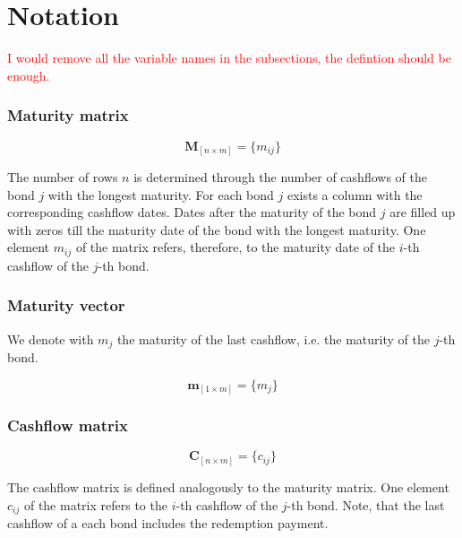 \newpage
\section{Notation}
\label{sec:notation}

\textcolor{red}{I would remove all the variable names in the subsections, the defintion should be enough.}

\subsubsection*{Maturity matrix}

\begin{equation}\label{maturitym}
\bm{M}_{\left[n\times m\right]}= \{m_{ij}\}
\end{equation}

The number of rows $n$ is determined through the number of cashflows of the bond $j$ with the longest maturity. For each bond $j$ exists a column with the corresponding cashflow dates. Dates after the maturity of the bond $j$ are filled up with zeros till the maturity date of the bond with the longest maturity. One element $m_{ij}$ of the matrix  refers, therefore, to the maturity date of  the $i$-th cashflow of the $j$-th bond. 

\subsubsection*{Maturity vector}

We denote with $m_j$ the maturity of the last cashflow, i.e. the maturity of the $j$-th bond.

\begin{equation}\label{weights}
    \bm{m}_{\left[1\times m\right]}= \{m_j\}
\end{equation}

\subsubsection*{Cashflow matrix}

 \begin{equation}\label{cashflowm}
\bm{C}_{\left[n\times m\right]}= \{c_{ij}\}
\end{equation}

 The cashflow matrix is defined analogously to the maturity matrix.  One element $c_{ij}$  of the matrix refers to the $i$-th cashflow of the $j$-th bond. Note, that the last cashflow of a each bond includes the redemption payment.

